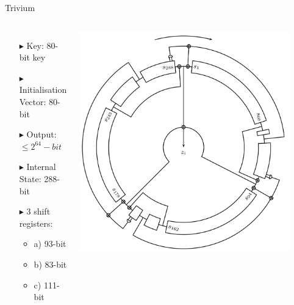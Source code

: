 \documentclass[10pt, compress]{beamer}
\begin{document}
    \begin{frame}{Trivium}
        \begin{columns}
            \begin{itemize}[itemsep=0.5cm]
                \item[$\blacktriangleright$] Key: 80-bit key
                \item[$\blacktriangleright$] Initialisation Vector: 80-bit
                \item[$\blacktriangleright$] Output: $\leq2^{64}-bit$
                \item[$\blacktriangleright$] Internal State: 288-bit
                \item[$\blacktriangleright$] 3 shift registers:
                \begin{itemize}
                    \item a) 93-bit
                    \item b) 83-bit
                    \item c) 111-bit
                \end{itemize}
            \end{itemize}
            \includegraphics[width=0.9\textwidth]{figures/round.png}\cite{circle}
        \end{columns}
    \end{frame}
\end{document}

